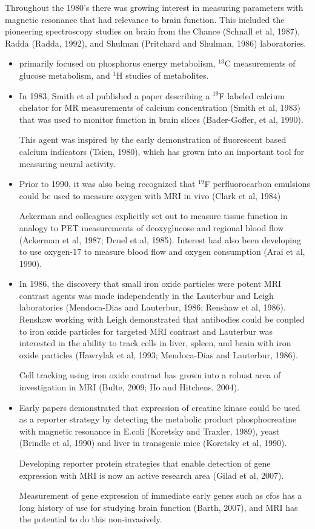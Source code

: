 Throughout the 1980's there was growing interest in measuring parameters with
magnetic resonance that had relevance to brain function.
This included the pioneering spectroscopy studies on brain from the Chance
(Schnall et al, 1987), Radda (Radda, 1992), and Shulman (Pritchard and Shulman,
1986) laboratories.
\begin{itemize}
  \item  primarily focused on phosphorus energy metabolism, $^{13}$C
  measurements of glucose metabolism, and $^{1}$H studies of metabolites.
  
  \item In 1983, Smith et al published a paper describing a $^{19}$F labeled
  calcium chelator for MR measurements of calcium concentration (Smith et al,
  1983) that was used to monitor function in brain slices (Bader-Goffer, et al,
  1990).
  
This agent was inspired by the early demonstration of fluorescent based calcium
indicators (Tsien, 1980), which has grown into an important tool for measuring
neural activity.
  
  \item Prior to 1990, it was also being recognized that $^{19}$F
  perfluorocarbon emulsions could be used to measure oxygen with MRI in vivo
  (Clark et al, 1984)
  
Ackerman and colleagues explicitly set out to measure tissue function in analogy
to PET measurements of deoxyglucose and regional blood flow (Ackerman et al,
1987; Deuel et al, 1985). Interest had also been developing to use oxygen-17 to
measure blood flow and oxygen consumption (Arai et al, 1990).  

  \item In 1986, the discovery that small iron oxide particles were potent MRI
  contrast agents was made independently in the Lauterbur and Leigh laboratories
  (Mendoca-Dias and Lauterbur, 1986; Renshaw et al, 1986). Renshaw working with
  Leigh demonstrated that antibodies could be coupled to iron oxide particles
  for targeted MRI contrast and Lauterbur was interested in the ability to track
  cells in liver, spleen, and brain with iron oxide particles (Hawrylak et al,
  1993; Mendoca-Dias and Lauterbur, 1986).

Cell tracking using iron oxide contrast has grown into a robust area of
investigation in MRI (Bulte, 2009; Ho and Hitchens, 2004). 

  \item Early papers demonstrated that expression of creatine kinase could be used as a
reporter strategy by detecting the metabolic product phosphocreatine with
magnetic resonance in E.coli (Koretsky and Traxler, 1989), yeast (Brindle et al,
1990) and liver in transgenic mice (Koretsky et al, 1990). 

Developing reporter protein strategies that enable detection of gene expression
with MRI is now an active research area (Gilad et al, 2007).

Measurement of gene expression of immediate early genes such as cfos has a long
history of use for studying brain function (Barth, 2007), and MRI has the
potential to do this non-invasively. 
  
\end{itemize}
